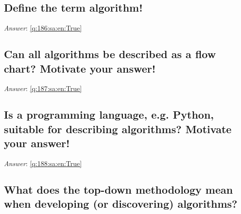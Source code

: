 \documentclass[a4paper,11pt,oneside]{article}
\begin{document}
\begin{sloppypar}
\subsection{Define the term algorithm!}

\label{q:186:sa:en:False}

\vspace{2cm}

\noindent\makebox[\textwidth]{\hrulefill}

\vspace{1cm}

\textit{Answer}: \autoref{q:186:sa:en:True}



\subsection{Can all algorithms be described as a flow chart? Motivate your answer!}

\label{q:187:sa:en:False}

\vspace{2cm}

\noindent\makebox[\textwidth]{\hrulefill}

\vspace{1cm}

\textit{Answer}: \autoref{q:187:sa:en:True}



\subsection{Is a programming language, e.g. Python, suitable for describing algorithms? Motivate your answer!}

\label{q:188:sa:en:False}

\vspace{2cm}

\noindent\makebox[\textwidth]{\hrulefill}

\vspace{1cm}

\textit{Answer}: \autoref{q:188:sa:en:True}



\subsection{What does the top-down methodology mean when developing (or discovering) algorithms?}

\label{q:189:sa:en:False}

\vspace{2cm}


\end{sloppypar}
\end{document}
